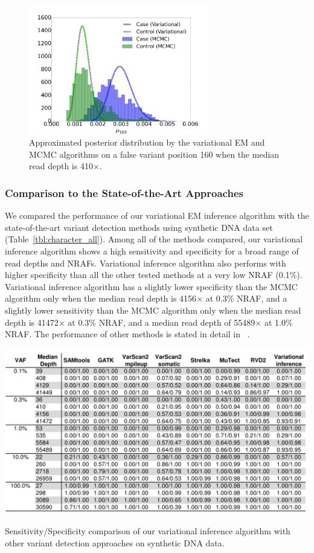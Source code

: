 \documentclass[11pt,reqno]{amsart}
\begin{document}
\begin{figure}[htbp]
\centering
\includegraphics[width=0.7\textwidth]{figs/position_160_410_mcmc_vs_var_mu_fig2.png}
\caption{Approximated posterior distribution by the variational EM and MCMC algorithms on a false variant position 160 when the median read depth is 410$\times$.}
\label{tbl:compare2}
\end{figure}
\subsubsection{Comparison to the State-of-the-Art Approaches}
We compared the performance of our variational EM inference algorithm with the state-of-the-art variant detection methods using synthetic DNA data set (Table~\ref{tbl:character_all}).
Among all of the methods compared, our variational inference algorithm shows a high sensitivity and specificity for a broad range of read depths and NRAFs.
Variational inference algorithm also performs with higher specificity than all the other tested methods at a very low NRAF (0.1\%).
Variational inference algorithm has a slightly lower specificity than the MCMC algorithm only when the median read depth is 4156$\times$ at 0.3\% NRAF, and a slightly lower sensitivity than the MCMC algorithm only when the median read depth is 41472$\times$ at 0.3\% NRAF, and a median read depth of 55489$\times$ at 1.0\% NRAF.
The performance of other methods is stated in detail in ~\citep{he2015rvd2}.
\begin{table}[htbp]
\centering
\includegraphics[width=1.0\textwidth]{tables/character_all.png}
\caption{Sensitivity/Specificity comparison of our variational inference algorithm with other variant detection approaches on synthetic DNA data.}
\vspace{-5pt}
\label{tbl:character_all}
\end{table}
\end{document}

